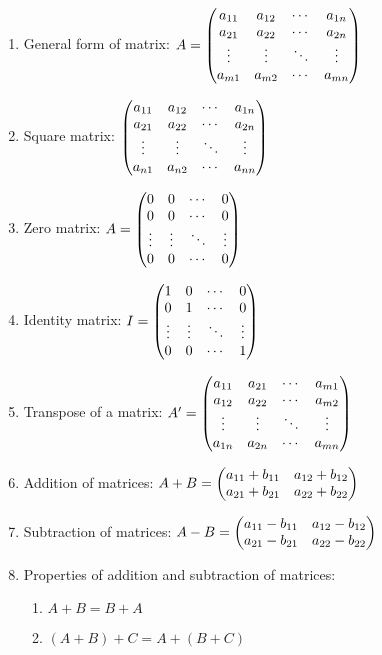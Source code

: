 \documentclass{report}
\begin{document}
\begin{multicols}{2}
    \begin{enumerate}
        \item General form of matrix: $A = \begin{pmatrix}a_{11} & a_{12} & \cdots & a_{1n} \\ a_{21} &
                      a_{22} & \cdots & a_{2n} \\ \vdots & \vdots & \ddots & \vdots \\ a_{m1} &
                      a_{m2} & \cdots & a_{mn}\end{pmatrix}$
        \item Square matrix: $\begin{pmatrix}a_{11} & a_{12} & \cdots & a_{1n} \\ a_{21} & a_{22} &
                      \cdots & a_{2n} \\ \vdots & \vdots & \ddots & \vdots \\ a_{n1} & a_{n2} &
                      \cdots & a_{nn}\end{pmatrix}$
        \item Zero matrix: $A = \begin{pmatrix}0 & 0 & \cdots & 0 \\ 0 & 0 & \cdots & 0 \\ \vdots &
                      \vdots & \ddots & \vdots \\ 0 & 0 & \cdots & 0\end{pmatrix}$
        \item Identity matrix: $I = \begin{pmatrix}1 & 0 & \cdots & 0 \\ 0 & 1 & \cdots & 0 \\ \vdots &
                      \vdots & \ddots & \vdots \\ 0 & 0 & \cdots & 1\end{pmatrix}$
        \item Transpose of a matrix: $A' = \begin{pmatrix}a_{11} & a_{21} & \cdots & a_{m1} \\ a_{12} &
                      a_{22} & \cdots & a_{m2} \\ \vdots & \vdots & \ddots & \vdots \\ a_{1n} &
                      a_{2n} & \cdots & a_{mn}\end{pmatrix}$
        \item Addition of matrices: $A + B = \begin{pmatrix} a_{11} + b_{11} & a_{12} + b_{12}\\ a_{21} +
                      b_{21} & a_{22} + b_{22} \end{pmatrix}$
        \item Subtraction of matrices: $A - B = \begin{pmatrix} a_{11} - b_{11} & a_{12} - b_{12}\\
                      a_{21} - b_{21} & a_{22} - b_{22} \end{pmatrix}$
        \item Properties of addition and subtraction of matrices:
              \begin{enumerate}
                  \item $A + B = B + A$
                  \item $(A + B) + C = A + (B + C)$

\end{enumerate}
\end{enumerate}
\end{multicols}
\end{document}
